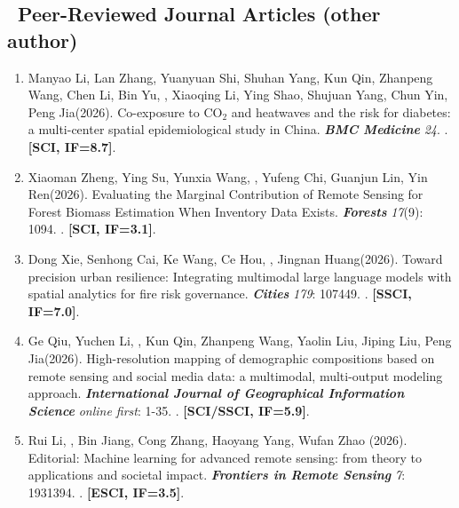 \subsection*{\texorpdfstring{\faBook\ Peer-Reviewed Journal Articles (other author)}{Other Peer-Reviewed Journal Articles (other author)}}
\begin{enumerate}
\item
    Manyao Li, Lan Zhang, Yuanyuan Shi\CS, Shuhan Yang, Kun Qin, Zhanpeng Wang, Chen Li, Bin Yu, \Shaoqing, Xiaoqing Li, Ying Shao, Shujuan Yang, Chun Yin, Peng Jia\CS (2026).
    Co-exposure to CO$_2$ and heatwaves and the risk for diabetes: a multi-center spatial epidemiological study in China.
    \textbf{\textit{BMC Medicine}} \textit{24}.
    . \textbf{[SCI, IF=8.7]}.
\item
    Xiaoman Zheng, Ying Su, Yunxia Wang, \Shaoqing, Yufeng Chi, Guanjun Lin, Yin Ren\CS (2026).
    Evaluating the Marginal Contribution of Remote Sensing for Forest Biomass Estimation When Inventory Data Exists.
    \textbf{\textit{Forests}} \textit{17}(9): 1094.
    . \textbf{[SCI, IF=3.1]}.
\item
    Dong Xie, Senhong Cai, Ke Wang, Ce Hou, \Shaoqing, Jingnan Huang\CS (2026).
    Toward precision urban resilience: Integrating multimodal large language models with spatial analytics for fire risk governance.
    \textbf{\textit{Cities}} \textit{179}: 107449.
    . \textbf{[SSCI, IF=7.0]}.
\item
    Ge Qiu, Yuchen Li, \Shaoqing, Kun Qin, Zhanpeng Wang, Yaolin Liu, Jiping Liu\CS, Peng Jia\CS (2026).
    High-resolution mapping of demographic compositions based on remote sensing and social media data: a multimodal, multi-output modeling approach.
    \textbf{\textit{International Journal of Geographical Information Science}} \textit{online first}: 1-35.
    . \textbf{[SCI/SSCI, IF=5.9]}.
\item
    Rui Li\CS, \Shaoqing, Bin Jiang, Cong Zhang, Haoyang Yang, Wufan Zhao (2026).
    Editorial: Machine learning for advanced remote sensing: from theory to applications and societal impact.
    \textbf{\textit{Frontiers in Remote Sensing}} \textit{7}: 1931394.
    . \textbf{[ESCI, IF=3.5]}.

\end{enumerate}
